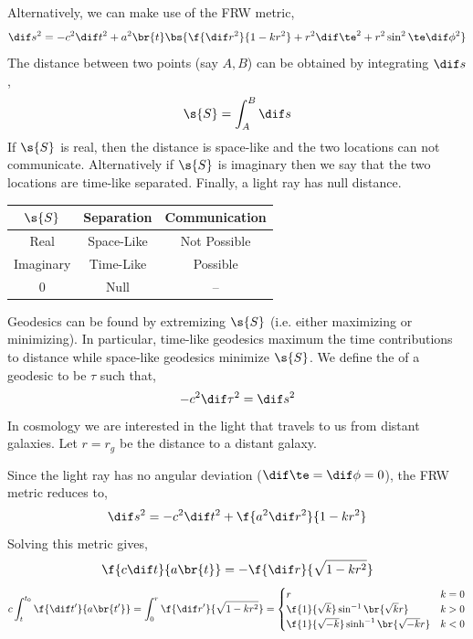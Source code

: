 \documentclass{article}
\begin{document}
Alternatively, we can make use of the FRW metric,
\[ \dif s^2 = - c^2 \dif t^2 + a^2\br{t} \bs{\f{\dif r^2}{1 - k r^2} + r^2 \dif \te^2 + r^2 \sin^2 \te \dif \phi^2} \]
The distance between two points (say $A,B$) can be obtained by integrating $\dif s$,
\[ \s{S} = \int_A^B \dif s \]
If $\s{S}$ is real, then the distance is space-like and the two locations can not communicate. Alternatively if $\s{S}$ is imaginary then we say that the two locations are time-like separated. Finally, a light ray has null distance.
\begin{center}
\begin{tabular}{|c|c|c|}
    \hline
    $\s{S}$ & Separation & Communication \\
    \hline
    Real & Space-Like & Not Possible \\
    Imaginary & Time-Like & Possible \\
    0 & Null & -- \\
    \hline
\end{tabular}
\end{center}
Geodesics can be found by extremizing $\s{S}$ (i.e. either maximizing or minimizing). In particular, time-like geodesics maximum the time contributions to distance while space-like geodesics minimize $\s{S}$. We define the  of a geodesic to be $\tau$ such that,
\[ -c^2 \dif \tau^2 = \dif s^2 \]
In cosmology we are interested in the light that travels to us from distant galaxies. Let $r=r_g$ be the distance to a distant galaxy.
\begin{center}
\end{center}
Since the light ray has no angular deviation ($\dif \te = \dif \phi = 0$), the FRW metric reduces to,
\[ \dif s^2 = - c^2 \dif t^2 + \f{a^2 \dif r^2}{1 - kr^2} \]
Solving this metric gives,
\[ \f{c \dif t}{a\br{t}} = - \f{\dif r}{\sqrt{1 - kr^2}} \]
\[ c\int_{t}^{t_0} \f{\dif t'}{a\br{t'}} = \int_{0}^{r} \f{\dif r'}{\sqrt{1 - kr^2}} = \begin{cases}
    r & k = 0 \\
    \f{1}{\sqrt{k}}\sin^{-1}\br{\sqrt{k}r} & k > 0\\
    \f{1}{\sqrt{-k}}\sinh^{-1}\br{\sqrt{-k}r} & k < 0\\
\end{cases} \]
\end{document}
